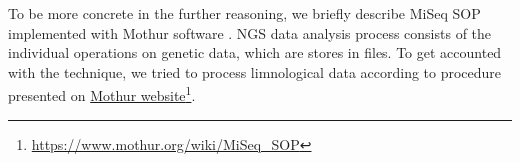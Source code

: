 \documentclass[a4paper]{jpconf}
\begin{document}
To be more concrete in the further reasoning, we briefly describe MiSeq SOP implemented with Mothur software \cite{mothur}.  NGS data analysis process consists of the individual operations on genetic data, which are stores in files. To get accounted with the technique, we tried to process limnological data \cite{mik19} according to procedure presented on \href{https://www.mothur.org/wiki/MiSeq_SOP}{Mothur website}\footnote{\url{https://www.mothur.org/wiki/MiSeq_SOP}}. %




\end{document}
